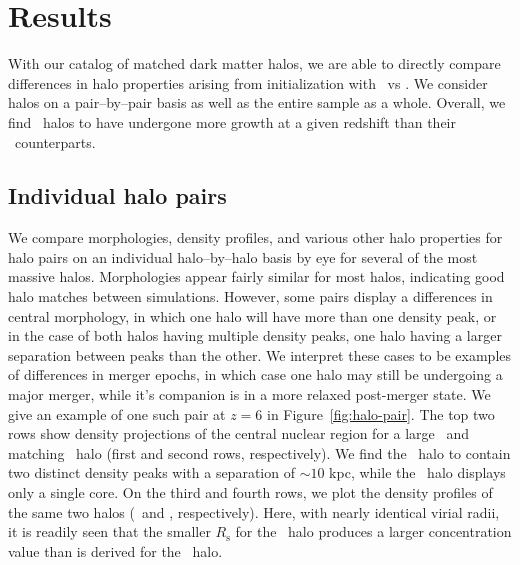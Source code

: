 
%
%

\section{Results}
\label{sec:results}



With our catalog of matched dark matter halos, we are able to directly compare differences in halo properties arising from initialization with \lpt\ vs \za.  We consider halos on a pair--by--pair basis as well as the entire sample as a whole.  Overall, we find \lpt\ halos to have undergone more growth at a given redshift than their \za\ counterparts.




\subsection{Individual halo pairs}


We compare morphologies, density profiles, and various other halo properties for halo pairs on an individual halo--by--halo basis by eye for several of the most massive halos.  Morphologies appear fairly similar for most halos, indicating good halo matches between simulations.  However, some pairs display a differences in central morphology, in which one halo will have more than one density peak, or in the case of both halos having multiple density peaks, one halo having a larger separation between peaks than the other.  We interpret these cases to be examples of differences in merger epochs, in which case one halo may still be undergoing a major merger, while it's companion is in a more relaxed post-merger state.  We give an example of one such pair at $z = 6$ in Figure~\ref{fig:halo-pair}.  The top two rows show density projections of the central nuclear region for a large \lpt\ and matching \za\ halo (first and second rows, respectively).  We find  the \za\ halo to contain two distinct density peaks with a separation of $\sim 10$ kpc, while the \lpt\ halo displays only a single core.  On the third and fourth rows, we plot the density profiles of the same two halos (\lpt\ and \za, respectively).  Here, with nearly identical virial radii, it is readily seen that the smaller $R_{\mathrm{s}}$ for the \lpt\ halo produces a larger concentration value than is derived for the \za\ halo.




